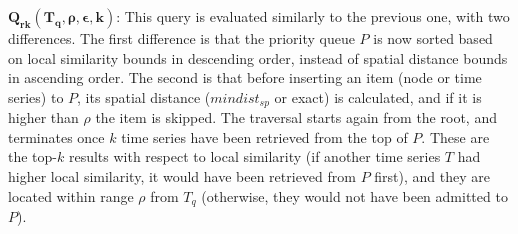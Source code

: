 \vspace{2mm}

\noindent $\mathbold{Q_{rk}(T_q, \rho, \epsilon, k)}$: This query is evaluated similarly to the previous one, with two differences. The first difference is that the priority queue $P$ is now sorted based on local similarity bounds in descending order, instead of spatial distance bounds in ascending order. The second is that before inserting an item (node or time series) to $P$, its spatial distance ($mindist_{sp}$ or exact) is calculated, and if it is higher than $\rho$ the item is skipped. The traversal starts again from the root, and terminates once $k$ time series have been retrieved from the top of $P$. These are the top-$k$ results with respect to local similarity (if another time series $T$ had higher local similarity, it would have been retrieved from $P$ first), and they are located within range $\rho$ from $T_q$ (otherwise, they would not have been admitted to $P$). 



